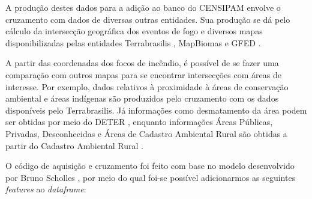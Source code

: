 A produção destes dados para a adição ao banco do CENSIPAM envolve o cruzamento com dados de diversas outras entidades. Sua produção se dá pelo cálculo da intersecção geográfica dos eventos de fogo e diversos mapas disponibilizadas pelas entidades Terrabrasilis \cite{terrabrasilis}, MapBiomas \cite{MapBiomasQueimadas} e GFED \cite{gfed}.

A partir das coordenadas dos focos de incêndio, é possível de se fazer uma comparação com outros mapas para se encontrar intersecções com áreas de interesse. Por exemplo, dados relativos à proximidade à áreas de conservação ambiental e áreas indígenas são produzidos pelo cruzamento com os dados disponíveis pelo Terrabrasilis. Já informações como desmatamento da área podem ser obtidas por meio do DETER \cite{deter}, enquanto informações Áreas Públicas, Privadas, Desconhecidas e Áreas de Cadastro Ambiental Rural são obtidas a partir do Cadastro Ambiental Rural \cite{cadastro-rural}.

 O código de aquisição e cruzamento foi feito com base no modelo desenvolvido por Bruno Scholles \cite{BrunoScholess2023}, por meio do qual foi-se possível adicionarmos as seguintes \textit{features} ao \textit{dataframe}:

